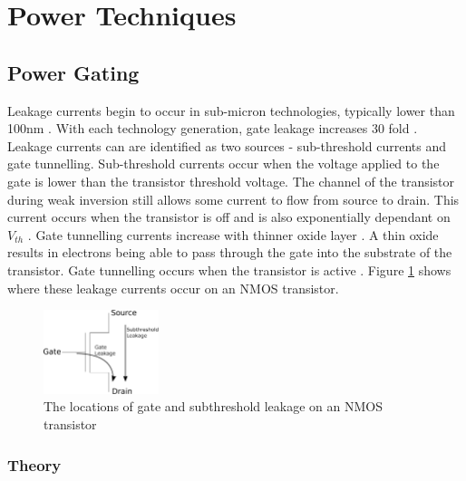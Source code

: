 
\section{Power Techniques}
\subsection{Power Gating}



Leakage currents begin to occur in sub-micron technologies, typically lower than 100nm \cite{bsoul2010fpga, nair2009comparative}.
With each technology generation, gate leakage increases 30 fold \cite{bernstein2003design}.
Leakage currents can are identified as two sources - sub-threshold currents and gate tunnelling. 
Sub-threshold currents occur when the voltage applied to the gate is lower than the transistor threshold voltage. 
The channel of the transistor during weak inversion still allows some current to flow from source to drain.
This current occurs when the transistor is off and is also exponentially dependant on $V_{th}$ \cite{borkar1999design}.
Gate tunnelling currents increase with thinner oxide layer \cite{m2002international}. 
A thin oxide results in electrons being able to pass through the gate into the substrate of the transistor. 
Gate tunnelling occurs when the transistor is active \cite{nair2009comparative}.
Figure \ref{fig:leakage} shows where these leakage currents occur on an NMOS transistor.

\begin{figure}
\centering
\includegraphics[width=0.3\textwidth]{Figures/leakage.eps}
\caption{The locations of gate and subthreshold leakage on an NMOS transistor}
\label{fig:leakage}
\end{figure}

\subsubsection{Theory}

